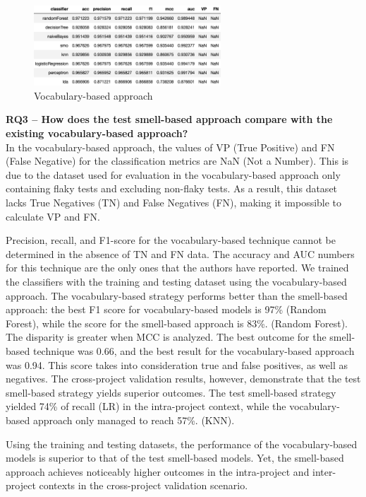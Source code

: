 \documentclass[sigconf,review]{acmart}
\begin{document}
\\
\begin{figure}
    \centering
    \includegraphics[width=7cm]{vocabulary apporach.png}
    \caption{Vocabulary-based approach}
    \label{fig:my_label}
\end{figure}

\textbf{ RQ3 – How does the test smell-based approach compare with the existing vocabulary-based approach?}
\\
 In the vocabulary-based approach, the values of VP (True Positive) and FN (False Negative) for the classification metrics are NaN (Not a Number). This is due to the dataset used for evaluation in the vocabulary-based approach only containing flaky tests and excluding non-flaky tests. As a result, this dataset lacks True Negatives (TN) and False Negatives (FN), making it impossible to calculate VP and FN.

Precision, recall, and F1-score for the vocabulary-based technique cannot be determined in the absence of TN and FN data. The accuracy and AUC numbers for this technique are the only ones that the authors have reported.
We trained the classifiers with the training and testing dataset using the vocabulary-based approach. The vocabulary-based strategy performs better than the smell-based approach: the best F1 score for vocabulary-based models is 97\% (Random Forest), while the score for the smell-based approach is 83\%. (Random Forest). The disparity is greater when MCC is analyzed. The best outcome for the smell-based technique was 0.66, and the best result for the vocabulary-based approach was 0.94. This score takes into consideration true and false positives, as well as negatives.
The cross-project validation results, however, demonstrate that the test smell-based strategy yields superior outcomes. The test smell-based strategy yielded 74\% of recall (LR) in the intra-project context, while the vocabulary-based approach only managed to reach 57\%. (KNN).



Using the training and testing datasets, the performance of the vocabulary-based models is superior to that of the test smell-based models. Yet, the smell-based approach achieves noticeably higher outcomes in the intra-project and inter-project contexts in the cross-project validation scenario.
\end{document}

